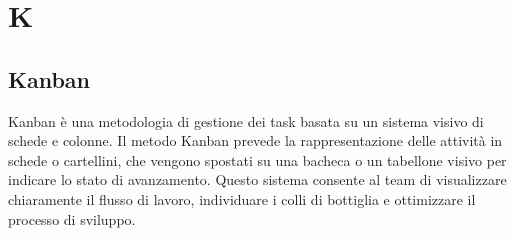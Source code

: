 \section{K}

\vspace{2em}
\subsection*{Kanban}
\par Kanban è una metodologia di gestione dei task basata su un sistema visivo di schede e colonne. Il metodo Kanban prevede la rappresentazione delle attività in schede o cartellini, che vengono spostati su una bacheca o un tabellone visivo per indicare lo stato di avanzamento. Questo sistema consente al team di visualizzare chiaramente il flusso di lavoro, individuare i colli di bottiglia e ottimizzare il processo di sviluppo.


